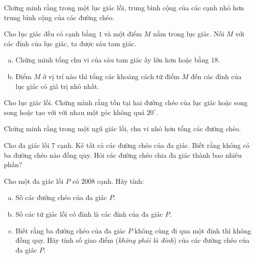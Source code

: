 \begin{bt}%
Chứng minh rằng trong một lục giác lồi, trung bình cộng của các cạnh nhỏ hơn trung bình cộng của các đường chéo.
\end{bt}

\begin{bt}%
Cho lục giác đều có cạnh bằng $1$ và một điểm $M$ nằm trong lục giác. Nối $M$ với các đỉnh của lục giác, ta được sáu tam giác.
\begin{enumerate}[a)]
\item Chứng minh tổng chu vi của sáu tam giác ấy lớn hơn hoặc bằng $18$.
\item Điểm $M$ ở vị trí nào thì tổng các khoảng cách từ điểm $M$ đến các đỉnh của lục giác có giá trị nhỏ nhất.
\end{enumerate}
\end{bt}

\begin{bt}%
Cho lục giác lồi. Chứng mình rằng tồn tại hai đường chéo của lục giác hoặc song song hoặc tạo với với nhau một góc không quá $20^{\circ}$.
\end{bt}

\begin{bt}%
Chứng minh rằng trong một ngũ giác lồi, chu vi nhỏ hơn tổng các đường chéo.
\end{bt}

\begin{bt}%
Cho đa giác lồi $7$ cạnh. Kẻ tất cả các đường chéo của đa giác. Biết rằng không có ba đường chéo nào đồng quy. Hỏi các đường chéo chia đa giác thành bao nhiêu phần?
\end{bt}

\begin{bt}%
Cho một đa giác lồi $P$ có $2008$ cạnh. Hãy tính:
\begin{enumerate}[a)]
\item Số các đường chéo của đa giác $P$.
\item Số các tứ giác lồi có đỉnh là các đỉnh của đa giác $P$.
\item Biết rằng ba đường chéo của đa giác $P$ không cùng đi qua một đỉnh thì không đồng quy. Hãy tính số giao điểm (\textit{không phải là đỉnh}) của các đường chéo của đa giác $P$.
\end{enumerate}
\end{bt}




